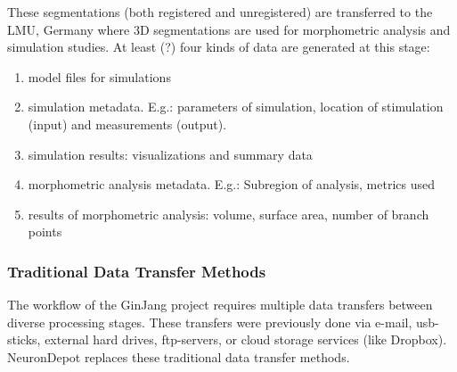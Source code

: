 \documentclass{frontiersSCNS} %
\begin{document}
These segmentations  (both registered and unregistered) are transferred to the
LMU, Germany where 3D segmentations are used for morphometric analysis and
simulation studies. At least (?) four kinds of data are generated at this
stage:

\begin{enumerate}
\item model files for simulations
\item simulation metadata. E.g.: parameters of simulation, location of stimulation (input) and measurements (output).
\item simulation results: visualizations and summary data
\item morphometric analysis metadata. E.g.: Subregion of analysis, metrics used
\item results of morphometric analysis: volume, surface area, number of branch points
\end{enumerate}


\subsubsection{Traditional Data Transfer Methods}

The workflow of the GinJang project requires multiple data transfers between
diverse processing stages. These transfers were previously done via e-mail,
usb-sticks, external hard drives, ftp-servers, or cloud storage services (like
Dropbox). NeuronDepot replaces these traditional data transfer methods.


\end{document}
